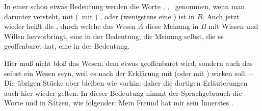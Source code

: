 In einer  schon etwas  Bedeutung werden die Worte , ,  \usw\ genommen, wenn man darunter versteht, mit  (\dh\ mit ) , oder  (wenigstens eine ) ist  in $B$. Auch jetzt wieder heißt die , durch welche das Wesen $A$ diese Meinung in $B$ mit Wissen und Willen hervorbringt, eine  in der  Bedeutung; die Meinung selbst, die es geoffenbaret hat, eine  in der  Bedeutung.\par
Hier muß nicht bloß das Wesen, dem etwas geoffenbaret wird, sondern auch das  selbst ein  Wesen seyn, weil es nach der Erklärung mit  (oder mit ) wirken soll. -- Die übrigen Stücke aber bleiben wie vorhin; daher die dortigen Erläuterungen auch hier wieder gelten. In dieser Bedeutung nimmt der Sprachgebrauch die Worte  und  in Sätzen, wie folgender: Mein Freund hat mir sein Innerstes .

